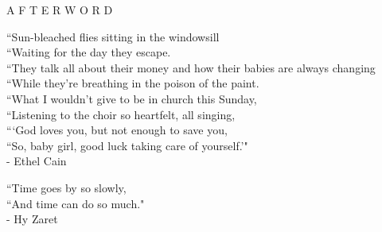 \documentclass[12pt]{article}
\begin{document}
\begingroup
\begin{center}
\end{center}
\endgroup

\vspace{17\baselineskip}

\begingroup
\begin{center}
\huge A F T E R W O R D
\end{center}
\endgroup

\vspace{3\baselineskip}

\begingroup
\begin{center}
``Sun-bleached flies sitting in the windowsill \\
``Waiting for the day they escape. \\
``They talk all about their money and how their babies are always changing \\
``While they're breathing in the poison of the paint. \\
``What I wouldn't give to be in church this Sunday, \\
``Listening to the choir so heartfelt, all singing, \\
```God loves you, but not enough to save you, \\
``So, baby girl, good luck taking care of yourself.'" \\
- Ethel Cain
\end{center}
\endgroup

\begingroup
\begin{center}
``Time goes by so slowly, \\
``And time can do so much." \\
- Hy Zaret
\end{center}
\endgroup
\end{document}
